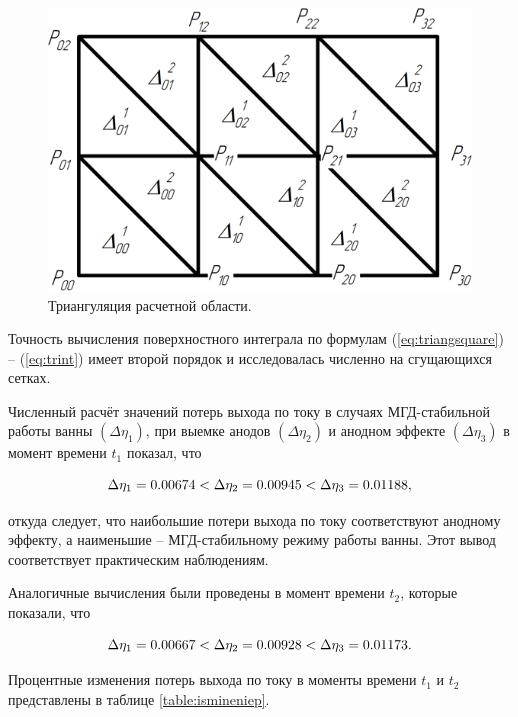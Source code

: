 \documentclass[pdflatex,sn-mathphys-gost]{pmi-jnl}
\begin{document}
\begin{figure}[ht]
    \centering
    \includegraphics[width=\textwidth]{triangul.png}
    \caption{Триангуляция расчетной области.}
    \label{fig:triangles}
\end{figure}

Точность вычисления поверхностного интеграла по формулам (\ref{eq:triangsquare}) – (\ref{eq:trint}) имеет второй порядок и исследовалась численно на сгущающихся сетках.

Численный расчёт значений потерь выхода по току в случаях МГД-стабильной работы ванны $(\Delta\eta_1)$, при выемке анодов $(\Delta\eta_2)$ и анодном эффекте $(\Delta\eta_3)$ в момент времени $t_1$ показал, что

\begin{equation}
	\Delta\eta_1 = 0.00674 < \Delta\eta_2 = 0.00945 < \Delta\eta_3 = 0.01188, \notag
\end{equation}

откуда следует, что наибольшие потери выхода по току соответствуют анодному эффекту, а наименьшие – МГД-стабильному режиму работы ванны. Этот вывод соответствует практическим наблюдениям.

Аналогичные вычисления были проведены в момент времени $t_2$, которые показали, что

\begin{equation}
	\Delta\eta_1 = 0.00667 < \Delta\eta_2 = 0.00928 < \Delta\eta_3 = 0.01173. \notag
\end{equation}

Процентные изменения потерь выхода по току в моменты времени $t_1$ и $t_2$ представлены в таблице \ref{table:ismineniep}.
\end{document}

